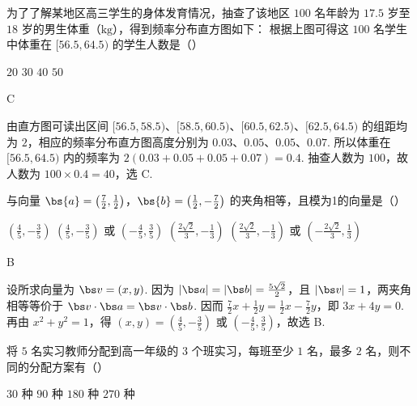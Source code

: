 \begin{problem}
为了了解某地区高三学生的身体发育情况，抽查了该地区 \(100\) 名年龄为 \(17.5\) 岁至 \(18\) 岁的男生体重（\(\mathrm{kg}\)），得到频率分布直方图如下：
根据上图可得这 \(100\) 名学生中体重在 \([56.5, 64.5)\) 的学生人数是（\quad）

\choices
    {\(20\)}
    {\(30\)}
    {\(40\)}
    {\(50\)}
\end{problem}

\begin{answer}
C
\end{answer}

\begin{solution}
由直方图可读出区间 \([56.5,58.5)\)、\([58.5,60.5)\)、\([60.5,62.5)\)、\([62.5,64.5)\) 的组距均为 \(2\)，相应的频率分布直方图高度分别为 \(0.03\)、\(0.05\)、\(0.05\)、\(0.07\). 所以体重在 \([56.5,64.5)\) 内的频率为 \(2\left(0.03+0.05+0.05+0.07\right)=0.4\). 抽查人数为 \(100\)，故人数为 \(100\times0.4=40\)，选 C.
\end{solution}

\begin{problem}
与向量 \(\bs{a} = \left(\frac{7}{2},\frac{1}{2}\right)\)，\(\bs{b} = \left(\frac{1}{2}, - \frac{7}{2}\right)\) 的夹角相等，且模为1的向量是（\quad）

\choices
    {\( \left(\frac{4}{5},-\frac{3}{5}\right) \)}
    {\(\left(\frac{4}{5}, -\frac{3}{5}\right)\) 或 \(\left(-\frac{4}{5}, \frac{3}{5}\right)\)}
    {\( \left(\frac{2\sqrt{2}}{3},-\frac{1}{3}\right) \)}
    {\(\left(\frac{2\sqrt{2}}{3}, -\frac{1}{3}\right)\) 或 \(\left(-\frac{2\sqrt{2}}{3}, \frac{1}{3}\right)\)}
\end{problem}

\begin{answer}
B
\end{answer}

\begin{solution}
设所求向量为 \(\bs v=(x,y)\). 因为 \(|\bs a|=|\bs b|=\frac{5\sqrt{2}}{2}\)，且 \(|\bs v|=1\)，两夹角相等等价于 \(\bs v\cdot\bs a=\bs v\cdot\bs b\). 因而 \(\frac{7}{2}x+\frac{1}{2}y=\frac{1}{2}x-\frac{7}{2}y\)，即 \(3x+4y=0\). 再由 \(x^{2}+y^{2}=1\)，得 \((x,y)=\left(\frac45,-\frac35\right)\) 或 \(\left(-\frac45,\frac35\right)\)，故选 B.
\end{solution}

\begin{problem}
将 \(5\) 名实习教师分配到高一年级的 \(3\) 个班实习，每班至少 \(1\) 名，最多 \(2\) 名，则不同的分配方案有（\quad）

\choices
    {\(30\text{ 种}\)}
    {\(90\text{ 种}\)}
    {\(180\text{ 种}\)}
    {\(270\text{ 种}\)}
\end{problem}

